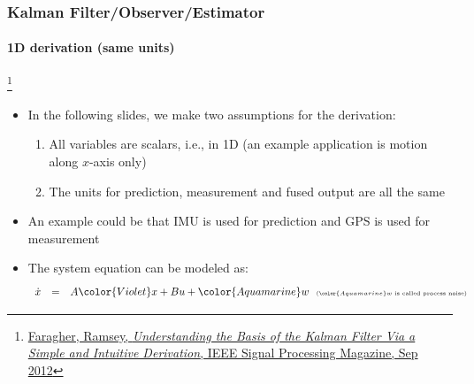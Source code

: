 \documentclass{beamer}
\begin{document}
\begin{frame}
\frametitle{Kalman Filter/Observer/Estimator}
\framesubtitle{1D derivation (same units)}

\footnote{\tiny\hspace{-0.23in} \href{http://www.cl.cam.ac.uk/~rmf25/papers/Understanding the Basis of the Kalman Filter.pdf}{Faragher, Ramsey, \emph{Understanding the Basis of the Kalman Filter Via a Simple and Intuitive Derivation}, IEEE Signal Processing Magazine, Sep 2012}}
\begin{itemize}\scriptsize 
\item In the following slides, we make two assumptions for the derivation:
\begin{enumerate}\scriptsize 
\item All variables are scalars, i.e., in 1D (an example application is motion along $x$-axis only)
\item The units for prediction, measurement and fused output are all the same
\end{enumerate}
\item An example could be that IMU is used for prediction and GPS is used for measurement
\item The system equation can be modeled as:
\begin{equation*}
\begin{array}{rlllll}
\dot{x}&=&A{\color{Violet}x}+B u+{\color{Aquamarine}w} \ \ \textrm{\tiny (${\color{Aquamarine}w}$ is called process noise)}\\
\end{array}
\end{equation*}
\end{itemize}
\end{frame}
\end{document}
